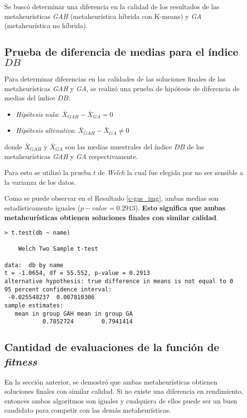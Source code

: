 	Se buscó determinar una diferencia en la calidad de los resultados de las
metaheurísticas \emph{GAH} (metaheurística híbrida con K-means) y
\emph{GA} (metaheurística no híbrida).

\subsection{Prueba de diferencia de medias para el índice $DB$}

    Para determinar diferencias en las calidades de las soluciones finales de las
metaheurísticas \emph{GAH} y \emph{GA}, se realizó una prueba de hipótesis de
diferencia de medias del índice $DB$:
\begin{itemize}
    \item \emph{Hipótesis nula}: $\bar{X}_{GAH} - \bar{X}_{GA} = 0$
    \item \emph{Hipótesis altenativa}: $\bar{X}_{GAH} - \bar{X}_{GA} \neq 0$
\end{itemize}
donde $\bar{X}_{GAH}$ y $\bar{X}_{GA}$ son las medias muestrales del índice
$DB$ de las metaheurísticas \emph{GAH} y \emph{GA} respectivamente.

    Para esto se utilizó la prueba $t$ de \emph{Welch} \cite{AB_0} la cual fue
elegida por no ser sensible a la varianza de los datos.

	Como se puede observar en el Resultado \ref{c-gas_img}, ambas medias son
estadísticamente iguales ($p-valor = 0.2913$). { \bf Esto significa que ambas
metaheurísticas obtienen soluciones finales con similar calidad}.

\begin{lstlisting}[float=h!, caption={Diferencia de Medias: Índice \emph{DB}}, label=c-gas_img]
> t.test(db ~ name)

	Welch Two Sample t-test

data:  db by name 
t = -1.0654, df = 55.552, p-value = 0.2913
alternative hypothesis: true difference in means is not equal to 0 
95 percent confidence interval:
 -0.025548237  0.007810306 
sample estimates:
   mean in group GAH mean in group GA
           0.7852724        0.7941414 
\end{lstlisting}


\subsection{Cantidad de evaluaciones de la función de \emph{fitness}}

	En la sección anterior, se demostró que ambas metaheurísticas obtienen
soluciones finales con similar calidad. Si no existe una diferencia en
rendimiento, entonces ambos algoritmos son iguales y cualquiera de ellos puede
ser un buen candidato para competir con las demás metaheurísticas.

